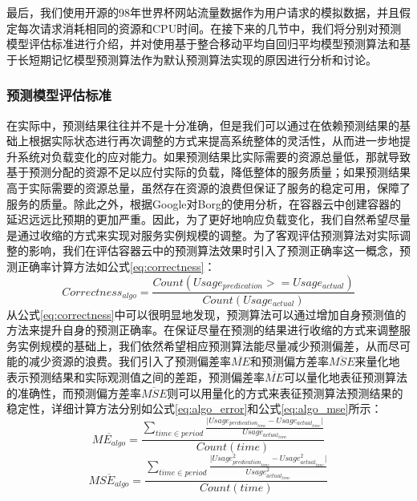 最后，我们使用开源的98年世界杯网站流量数据\cite{arlitt2000workload}作为用户请求的模拟数据，并且假定每次请求消耗相同的资源和CPU时间。在接下来的几节中，我们将分别对预测模型评估标准进行介绍，并对使用基于整合移动平均自回归平均模型预测算法和基于长短期记忆模型预测算法作为默认预测算法实现的原因进行分析和讨论。

\subsubsection{预测模型评估标准}
在实际中，预测结果往往并不是十分准确，但是我们可以通过在依赖预测结果的基础上根据实际状态进行再次调整的方式来提高系统整体的灵活性，从而进一步地提升系统对负载变化的应对能力。如果预测结果比实际需要的资源总量低，那就导致基于预测分配的资源不足以应付实际的负载，降低整体的服务质量；如果预测结果高于实际需要的资源总量，虽然存在资源的浪费但保证了服务的稳定可用，保障了服务的质量。除此之外，根据Google对Borg的使用分析，在容器云中创建容器的延迟远远比预期的更加严重\cite{verma2015large}。因此，为了更好地响应负载变化，我们自然希望尽量是通过收缩的方式来实现对服务实例规模的调整。为了客观评估预测算法对实际调整的影响，我们在评估容器云中的预测算法效果时引入了预测正确率这一概念，预测正确率计算方法如公式\ref{eq:correctness}：
\begin{equation}\label{eq:correctness}
Correctness_{algo} = \frac{Count(Usage_{predication} >= Usage_{actual})}{Count(Usage_{actual})}
\end{equation}
从公式\ref{eq:correctness}中可以很明显地发现，预测算法可以通过增加自身预测值的方法来提升自身的预测正确率。在保证尽量在预测的结果进行收缩的方式来调整服务实例规模的基础上，我们依然希望相应预测算法能尽量减少预测偏差，从而尽可能的减少资源的浪费。我们引入了预测偏差率$\overline{ME}$和预测偏方差率$\overline{MSE}$来量化地表示预测结果和实际观测值之间的差距，预测偏差率$\overline{ME}$可以量化地表征预测算法的准确性，而预测偏方差率$\overline{MSE}$则可以用量化的方式来表征预测算法预测结果的稳定性，详细计算方法分别如公式\ref{eq:algo_error}和公式\ref{eq:algo_mse}所示：
\begin{equation}\label{eq:algo_error}
\overline{ME_{algo}} = \frac{\sum_{time \in period} {\frac{\vert Usage_{predication_{time}} - Usage_{actual_{time}}\vert}{Usage_{actual_{time}}}}}{Count(time)}
\end{equation}
\begin{equation}\label{eq:algo_mse}
\overline{MSE_{algo}} = \frac{\sum_{time \in period} {\frac{\vert Usage_{predication_{time}}^{2} - Usage_{actual_{time}}^{2}\vert}{Usage_{actual_{time}}^{2}}}}{Count(time)}
\end{equation}

